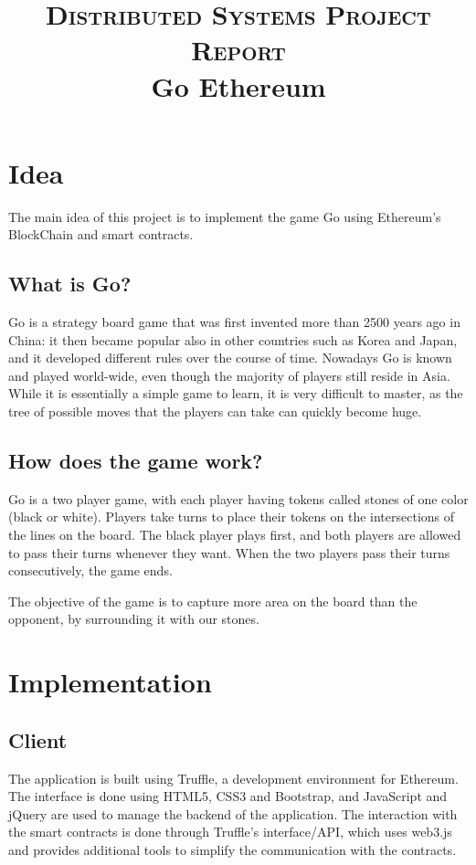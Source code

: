 \documentclass[10pt]{article}
\title{\large{\textsc{Distributed Systems Project Report}}\\
      \huge{Go Ethereum}}
\date{}
\author{}
\begin{document}
\maketitle
\vspace{-30pt}
\thispagestyle{fancy}
\pagestyle{fancy}
\section{Idea}
The main idea of this project is to implement the game Go using Ethereum's
BlockChain and smart contracts.
\subsection{What is Go?}
Go is a strategy board game that was first invented more than 2500 years ago
in China: it then became popular also in other countries such as Korea and Japan,
and it developed different rules over the course of time.
Nowadays Go is known and played world-wide, even though the majority of players
still reside in Asia. While it is essentially a simple game to learn, it is
very difficult to master, as the tree of possible moves that the players can take
can quickly become huge.

\subsection{How does the game work?}
Go is a two player game, with each player having tokens called stones of one
color (black or white). Players take turns to place their tokens on the
intersections of the lines on the board.
 The black player plays first, and both players are allowed to pass their turns
 whenever they want. When the two players pass their turns consecutively, the game ends.

The objective of the game is to capture more area on the board than the opponent,
by surrounding it with our stones.

\section{Implementation}

\subsection{Client}
The application is built using Truffle, a development environment for Ethereum.
The interface is done using HTML5, CSS3 and Bootstrap, and JavaScript and jQuery
are used to manage the backend of the application. The interaction with the
smart contracts is done through Truffle's interface/API, which uses web3.js and
provides additional tools to simplify the communication with the contracts.
\end{document}

